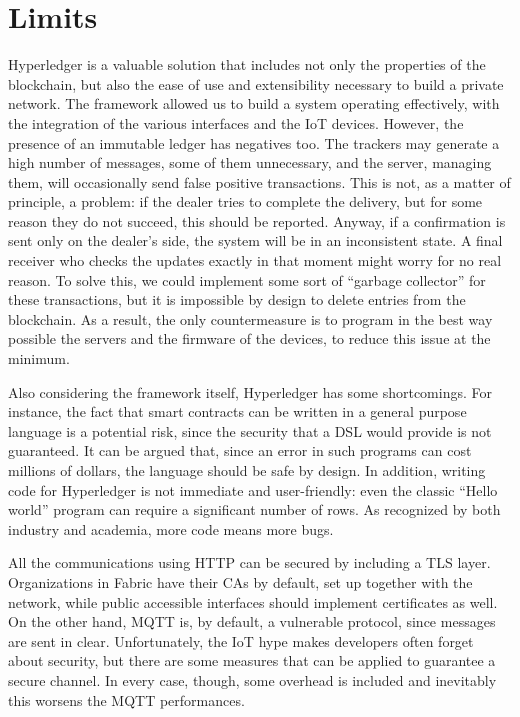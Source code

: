 \section{Limits}
Hyperledger is a valuable solution that includes not only the properties of the blockchain, but also the ease of use and extensibility necessary to build a private network. The framework allowed us to build a system operating effectively, with the integration of the various interfaces and the IoT devices. However, the presence of an immutable ledger has negatives too. The trackers may generate a high number of messages, some of them unnecessary, and the server, managing them, will occasionally send false positive transactions. This is not, as a matter of principle, a problem: if the dealer tries to complete the delivery, but for some reason they do not succeed, this should be reported. Anyway, if a confirmation is sent only on the dealer's side, the system will be in an inconsistent state. A final receiver who checks the updates exactly in that moment might worry for no real reason. To solve this, we could implement some sort of ``garbage collector'' for these transactions, but it is impossible by design to delete entries from the blockchain. As a result, the only countermeasure is to program in the best way possible the servers and the firmware of the devices, to reduce this issue at the minimum.

Also considering the framework itself, Hyperledger has some shortcomings. For instance, the fact that smart contracts can be written in a general purpose language is a potential risk, since the security that a DSL would provide is not guaranteed. It can be argued that, since an error in such programs can cost millions of dollars, the language should be safe by design. In addition, writing code for Hyperledger is not immediate and user-friendly: even the classic ``Hello world'' program can require a significant number of rows. As recognized by both industry and academia, more code means more bugs.

All the communications using HTTP can be secured by including a TLS layer. Organizations in Fabric have their CAs by default, set up together with the network, while public accessible interfaces should implement certificates as well. On the other hand, MQTT is, by default, a vulnerable protocol, since messages are sent in clear. Unfortunately, the IoT hype makes developers often forget about security, but there are some measures that can be applied to guarantee a secure channel. In every case, though, some overhead is included and inevitably this worsens the MQTT performances.

